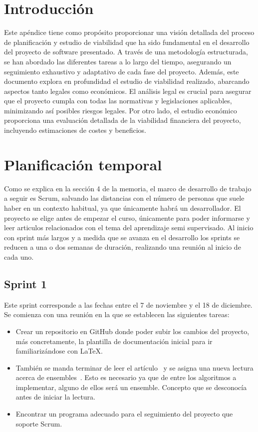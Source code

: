 
\section{Introducción}
Este apéndice tiene como propósito proporcionar una visión detallada del proceso de planificación y estudio de viabilidad que ha sido fundamental en el desarrollo del proyecto de software presentado. A través de una metodología estructurada, se han abordado las diferentes tareas a lo largo del tiempo, asegurando un seguimiento exhaustivo y adaptativo de cada fase del proyecto.
Además, este documento explora en profundidad el estudio de viabilidad realizado, abarcando aspectos tanto legales como económicos. El análisis legal es crucial para asegurar que el proyecto cumpla con todas las normativas y legislaciones aplicables, minimizando así posibles riesgos legales. Por otro lado, el estudio económico proporciona una evaluación detallada de la viabilidad financiera del proyecto, incluyendo estimaciones de costes y beneficios.

\section{Planificación temporal}
Como se explica en la sección 4 de la memoria, el marco de desarrollo de trabajo a seguir es Scrum, salvando las distancias con el número de personas que suele haber en un contexto habitual, ya que únicamente habrá un desarrollador.
El proyecto se elige antes de empezar el curso, únicamente para poder informarse y leer articulos relacionados con el tema del aprendizaje semi supervisado. Al inicio con sprint más largos y a medida que se avanza en el desarrollo los sprints se reducen a una o dos semanas de duración, realizando una reunión al inicio de cada uno.


\subsection{Sprint 1}
Este sprint corresponde a las fechas entre el 7 de noviembre y el 18 de diciembre. Se comienza con una reunión en la que se establecen las siguientes tareas:\\
\begin{itemize}
	\item Crear un repositorio en GitHub donde poder subir los cambios del proyecto, más concretamente, la plantilla de documentación inicial para ir familiarizándose con \LaTeX.
	\item También se manda terminar de leer el artículo~\cite{Engelen:semi-supervised} y se asigna una nueva lectura acerca de ensembles~\cite{ensembles}. Esto es necesario ya que de entre los algoritmos a implementar, alguno de ellos será un ensemble. Concepto que se desconocía antes de iniciar la lectura.
	\item Encontrar un programa adecuado para el seguimiento del proyecto que soporte Scrum.
\end{itemize}


